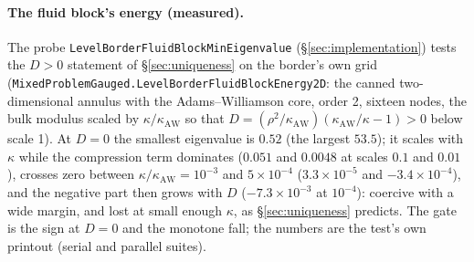 \documentclass[11pt]{article}
\theoremstyle{definition}
\theoremstyle{remark}
\newcommand{\code}[1]{\texttt{#1}}
\begin{document}
\paragraph{The fluid block's energy (measured).} The
probe \code{LevelBorderFluidBlockMinEigenvalue}
(\S\ref{sec:implementation}) tests the $D > 0$ statement of
\S\ref{sec:uniqueness} on the border's own grid
(\code{MixedProblemGauged.LevelBorderFluidBlockEnergy2D}: the canned
two-dimensional annulus with the Adams--Williamson core, order 2,
sixteen nodes, the bulk modulus scaled by $\kappa/\kappa_{\mathrm{AW}}$ so
that $D = (\rho^2/\kappa_{\mathrm{AW}})(\kappa_{\mathrm{AW}}/\kappa - 1) >
0$ below scale 1). At $D = 0$ the smallest eigenvalue is $0.52$ (the
largest $53.5$); it scales with $\kappa$ while the compression term
dominates ($0.051$ and $0.0048$ at scales $0.1$ and $0.01$), crosses
zero between $\kappa/\kappa_{\mathrm{AW}} = 10^{-3}$ and
$5\times10^{-4}$ ($3.3\times10^{-5}$ and $-3.4\times10^{-4}$), and the
negative part then grows with $D$ ($-7.3\times10^{-3}$ at $10^{-4}$):
coercive with a wide margin, and lost at small enough $\kappa$, as
\S\ref{sec:uniqueness} predicts. The gate is the sign at $D = 0$ and
the monotone fall; the numbers are the test's own printout (serial and
parallel suites).
\end{document}

